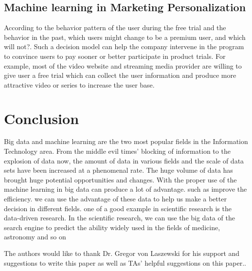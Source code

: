 \documentclass[sigconf]{acmart}
\begin{document}
\subsection{Machine learning in Marketing Personalization}
According to the behavior pattern of the user during the free trial and the behavior in the past, which users might change to be a premium user, and which will not?. Such a decision model can help the company intervene in the program to convince users to pay sooner or better participate in product trials. For example, most of the video website and streaming media provider are willing to give user a free trial which can collect the user information and produce more attractive video or series to increase the user base\cite{Bernard01}.
\section{Conclusion}
Big data and machine learning are the two most popular fields in the Information Technology area. From the middle evil times' blocking of information to the explosion of data now, the amount of data in various fields and the scale of data sets have been increased at a phenomenal rate. The huge volume of data has brought huge potential opportunities and changes. With the proper use of the machine learning in big data can produce a lot of advantage. such as improve the efficiency. we can use the advantage of these data to help us make a better decision in different fields. one of a good example in scientific research is the data-driven research. In the scientific research, we can use the big data of the search engine to predict the ability widely used in the fields of medicine, astronomy and so on


\begin{acks}

  The authors would like to thank Dr. Gregor von Laszewski for his support and suggestions to write this paper as well as TAs' helpful suggestions on this paper.. 

\end{acks}


 
\end{document}
